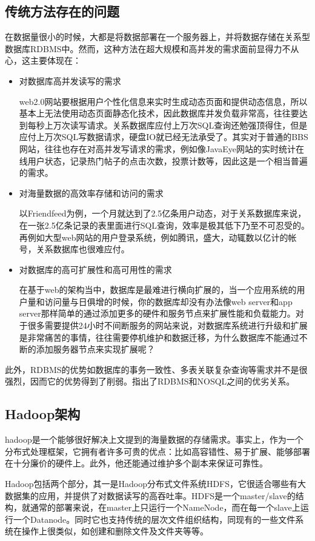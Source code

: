 \subsection{传统方法存在的问题}
  在数据量很小的时候，大都是将数据部署在一个服务器上，并将数据存储在关系型数据库RDBMS中。然而，这种方法在超大规模和高并发的需求面前显得力不从心，这主要体现在：
\begin{itemize}
\item 对数据库高并发读写的需求

  web2.0网站要根据用户个性化信息来实时生成动态页面和提供动态信息，所以基本上无法使用动态页面静态化技术，因此数据库并发负载非常高，往往要达到每秒上万次读写请求。关系数据库应付上万次SQL查询还勉强顶得住，但是应付上万次SQL写数据请求，硬盘IO就已经无法承受了。其实对于普通的BBS网站，往往也存在对高并发写请求的需求，例如像JavaEye网站的实时统计在线用户状态，记录热门帖子的点击次数，投票计数等，因此这是一个相当普遍的需求。 
\item  对海量数据的高效率存储和访问的需求

  以Friendfeed为例，一个月就达到了2.5亿条用户动态，对于关系数据库来说，在一张2.5亿条记录的表里面进行SQL查询，效率是极其低下乃至不可忍受的。再例如大型web网站的用户登录系统，例如腾讯，盛大，动辄数以亿计的帐号，关系数据库也很难应付。 
\item 对数据库的高可扩展性和高可用性的需求

  在基于web的架构当中，数据库是最难进行横向扩展的，当一个应用系统的用户量和访问量与日俱增的时候，你的数据库却没有办法像web server和app server那样简单的通过添加更多的硬件和服务节点来扩展性能和负载能力。对于很多需要提供24小时不间断服务的网站来说，对数据库系统进行升级和扩展是非常痛苦的事情，往往需要停机维护和数据迁移，为什么数据库不能通过不断的添加服务器节点来实现扩展呢？ 
\end{itemize}
  此外，RDBMS的优势如数据库的事务一致性、多表关联复杂查询等需求并不是很强烈，因而它的优势得到了削弱。\cite{MSU-CSE-99-39}指出了RDBMS和NOSQL之间的优劣关系。

\subsection{Hadoop架构}
  hadoop是一个能够很好解决上文提到的海量数据的存储需求。事实上，作为一个分布式处理框架，它拥有者许多可贵的优点：比如高容错性、易于扩展、能够部署在十分廉价的硬件上。此外，他还能通过维护多个副本来保证可靠性。


  Hadoop包括两个部分，其一是Hadoop分布式文件系统HDFS，它很适合哪些有大数据集的应用，并提供了对数据读写的高吞吐率。HDFS是一个master/slave的结构，就通常的部署来说，在master上只运行一个NameNode，而在每一个slave上运行一个Datanode。同时它也支持传统的层次文件组织结构，同现有的一些文件系统在操作上很类似，如创建和删除文件及文件夹等等。


